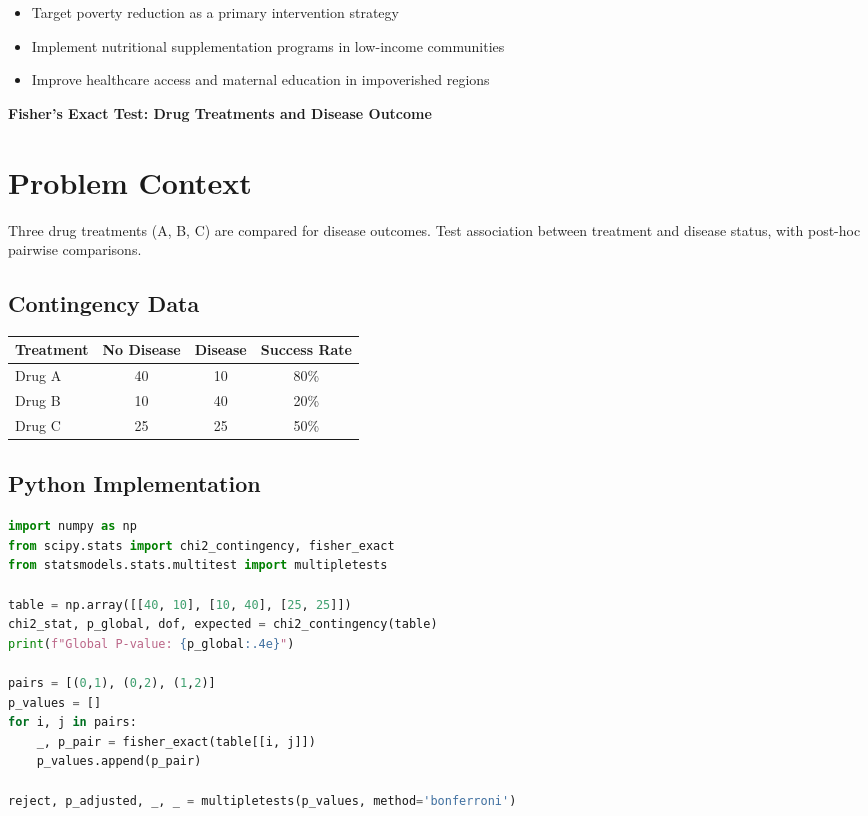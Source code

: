 \documentclass[12pt, a4paper]{article}
\newcounter{problemcounter}
\newcommand{\problemtitle}[1]{%
    \vspace{1cm}
    \begin{tcolorbox}[
        colback=DeepForest!5,
        colframe=DeepForest,
        arc=15pt,
        boxrule=1.2pt,
        left=20pt,
        right=20pt,
        top=12pt,
        bottom=12pt,
        enhanced,
        attach boxed title to top center={yshift=-8pt},
        boxed title style={
            colback=AmberSunset,
            colframe=DeepForest,
            arc=10pt,
            outer arc=10pt,
            boxrule=0.8pt,
            sharp corners,
            },
        title={\color{white}\large\sffamily\bfseries \faTasks \quad PROBLEM \arabic{problemcounter}}
    ]
        \centering
        {\color{DeepForest}\Large\bfseries\sffamily #1}
    \end{tcolorbox}
    \stepcounter{problemcounter}
    \vspace{0.3cm}
}
\begin{document}
\begin{itemize}
    \item Target poverty reduction as a primary intervention strategy
    \item Implement nutritional supplementation programs in low-income communities
    \item Improve healthcare access and maternal education in impoverished regions
\end{itemize}

\newpage

\problemtitle{Fisher's Exact Test: Drug Treatments and Disease Outcome}

\section*{Problem Context}
Three drug treatments (A, B, C) are compared for disease outcomes. Test association between treatment and disease status, with post-hoc pairwise comparisons.

\subsection*{Contingency Data}

\begin{center}
\begin{tabular}{lccc}
\toprule
\textbf{Treatment} & \textbf{No Disease} & \textbf{Disease} & \textbf{Success Rate} \\
\midrule
Drug A & 40 & 10 & 80\% \\
Drug B & 10 & 40 & 20\% \\
Drug C & 25 & 25 & 50\% \\
\bottomrule
\end{tabular}
\end{center}

\subsection*{Python Implementation}

\begin{lstlisting}[language=Python]
import numpy as np
from scipy.stats import chi2_contingency, fisher_exact
from statsmodels.stats.multitest import multipletests

table = np.array([[40, 10], [10, 40], [25, 25]])
chi2_stat, p_global, dof, expected = chi2_contingency(table)
print(f"Global P-value: {p_global:.4e}")

pairs = [(0,1), (0,2), (1,2)]
p_values = []
for i, j in pairs:
    _, p_pair = fisher_exact(table[[i, j]])
    p_values.append(p_pair)

reject, p_adjusted, _, _ = multipletests(p_values, method='bonferroni')
\end{lstlisting}
\end{document}
